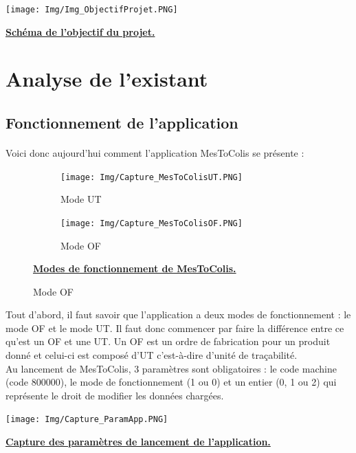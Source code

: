 \documentclass[a4paper,12pt]{extarticle}
\newcommand{\espace}{\vspace{0.3cm}}
\begin{document}
\centerline{\texttt{[image: Img/Img\_ObjectifProjet.PNG]}}
\centerline{\textbf{\underline{Schéma de l’objectif du projet.}}}
\espace{}

	\clearpage
	
	\section{Analyse de l'existant}
	
	\subsection{Fonctionnement de l'application}
		\paragraph{}
	
	Voici donc aujourd’hui comment l’application MesToColis se présente : \\

\begin{figure}[h]

\begin{subfigure}{0.5\textwidth}
	\texttt{[image: Img/Capture\_MesToColisUT.PNG]}
	\caption{Mode UT}
	\label{subim1}
\end{subfigure}
\begin{subfigure}{0.5\textwidth}
	\texttt{[image: Img/Capture\_MesToColisOF.PNG]}
	\caption{Mode OF}
	\label{subim2}
\end{subfigure}

	\espace{}
	\centerline{\textbf{\underline{Modes de fonctionnement de MesToColis.}}}
\end{figure}

Tout d’abord, il faut savoir que l'application a deux modes de fonctionnement : le mode OF et le mode UT. Il faut donc commencer par faire la différence entre ce qu’est un OF et une UT. Un OF est un ordre de fabrication pour un produit donné et celui-ci est composé d’UT c’est-à-dire d’unité de traçabilité.\\
Au lancement de MesToColis, 3 paramètres sont obligatoires : le code machine (code 800000), le mode de fonctionnement (1 ou 0) et un entier (0, 1 ou 2) qui représente le droit de modifier les données chargées.\\

\centerline{\texttt{[image: Img/Capture\_ParamApp.PNG]}}
\centerline{\textbf{\underline{Capture des paramètres de lancement de l’application.}}}
\espace{}
\end{document}
